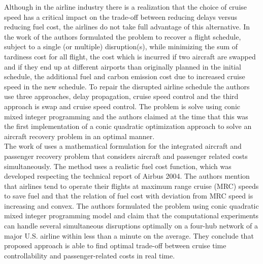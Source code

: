 Although in the airline industry there is a realization that the choice of cruise speed has a critical impact on the trade-off between reducing delays versus reducing fuel cost, the airlines do not take full advantage of this alternative.
In the work of \citep{Aktuerk2014} the authors formulated the problem to recover a flight schedule, subject to a single (or multiple) disruption(s), while minimizing the sum of tardiness cost for all flight, the cost which is incurred if two aircraft are swapped and if they end up at different airports than originally planned in the initial schedule, the additional fuel and carbon emission cost due to increased cruise speed in the new schedule.
To repair the disrupted airline schedule the authors use three approaches, delay propagation, cruise speed control and the third approach is swap and cruise speed control. The problem is solve using conic mixed integer programming and the authors claimed at the time that this was the first implementation of a conic quadratic optimization approach to solve an aircraft recovery problem in an optimal manner.\\
The work of \citep{Arikan2016} uses a mathematical formulation for the integrated aircraft and passenger recovery problem that considers aircraft and passenger related costs simultaneously. The method uses a realistic fuel cost function, which was developed respecting the technical report of Airbus 2004.  The authors mention that airlines tend to operate their flights at maximum range cruise (MRC)  speeds to save fuel and that the relation of fuel cost with deviation from MRC speed is increasing and convex. The authors formulated the problem using conic quadratic mixed integer programming model and claim that the computational experiments can handle several simultaneous disruptions optimally on a four-hub network of a major U.S. airline within less than a minute on the average. They conclude that proposed approach is able to find optimal trade-off between cruise time controllability and passenger-related costs in real time.\\
